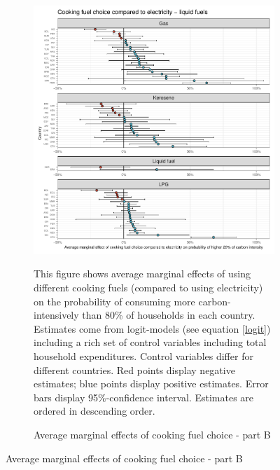  \begin{figure}[ht!]\ContinuedFloat
   \centering
   \begin{subfigure}[b]{\textwidth}
   \centering
   \includegraphics{1_Figures/Analysis_Logit_Models_Marginal_Effects/Average_Marginal_Effects_affected_upper_80_CF_Electricity B_2017B.pdf}
   \caption{Average marginal effects of cooking fuel choice - part B} \label{fig:Logit_ME_CF_2}
   \begin{subcaption2}
     This figure shows average marginal effects of using different cooking fuels (compared to using electricity) on the probability of consuming more carbon-intensively than 80\% of households in each country. Estimates come from logit-models (see equation \ref{logit}) including a rich set of control variables including total household expenditures. Control variables differ for different countries. Red points display negative estimates; blue points display positive estimates. Error bars display 95\%-confidence interval. Estimates are ordered in descending order.
   \end{subcaption2}
   \end{subfigure}
 \end{figure}
 \clearpage

